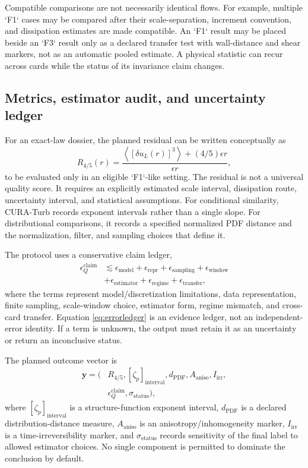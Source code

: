 \documentclass[conference]{../../../../Conference-LaTeX-template_10-17-19/IEEEtran}
\begin{document}
Compatible comparisons are not necessarily identical flows. For example, multiple `F1` cases may be compared after their scale-separation, increment convention, and dissipation estimates are made compatible. An `F1` result may be placed beside an `F3` result only as a declared transfer test with wall-distance and shear markers, not as an automatic pooled estimate. A physical statistic can recur across cards while the status of its invariance claim changes.

\subsection{Metrics, estimator audit, and uncertainty ledger}
For an exact-law dossier, the planned residual can be written conceptually as
\begin{equation}
R_{4/5}(r)=\frac{\left\langle[\delta u_L(r)]^3\right\rangle+(4/5)\epsilon r}{\epsilon r},
\label{eq:residual}
\end{equation}
to be evaluated only in an eligible `F1`-like setting. The residual is not a universal quality score. It requires an explicitly estimated scale interval, dissipation route, uncertainty interval, and statistical assumptions. For conditional similarity, CURA-Turb records exponent intervals rather than a single slope. For distributional comparisons, it records a specified normalized PDF distance and the normalization, filter, and sampling choices that define it.

The protocol uses a conservative claim ledger,
\begin{align}
\epsilon_Q^{\mathrm{claim}} &\lesssim \epsilon_{\mathrm{model}}+\epsilon_{\mathrm{repr}}+\epsilon_{\mathrm{sampling}}+\epsilon_{\mathrm{window}} \nonumber\\
&+\epsilon_{\mathrm{estimator}}+\epsilon_{\mathrm{regime}}+\epsilon_{\mathrm{transfer}},
\label{eq:errorledger}
\end{align}
where the terms represent model/discretization limitations, data representation, finite sampling, scale-window choice, estimator form, regime mismatch, and cross-card transfer. Equation \eqref{eq:errorledger} is an evidence ledger, not an independent-error identity. If a term is unknown, the output must retain it as an uncertainty or return an inconclusive status.

The planned outcome vector is
\begin{align}
\mathbf{y}=\bigl(&R_{4/5},[\zeta_p]_{\mathrm{interval}},d_{\mathrm{PDF}},A_{\mathrm{aniso}},I_{\mathrm{irr}}, \nonumber\\
&\epsilon_Q^{\mathrm{claim}},\sigma_{\mathrm{status}}\bigr),
\label{eq:outcomevector}
\end{align}
where $[\zeta_p]_{\mathrm{interval}}$ is a structure-function exponent interval, $d_{\mathrm{PDF}}$ is a declared distribution-distance measure, $A_{\mathrm{aniso}}$ is an anisotropy/inhomogeneity marker, $I_{\mathrm{irr}}$ is a time-irreversibility marker, and $\sigma_{\mathrm{status}}$ records sensitivity of the final label to allowed estimator choices. No single component is permitted to dominate the conclusion by default.
\end{document}
